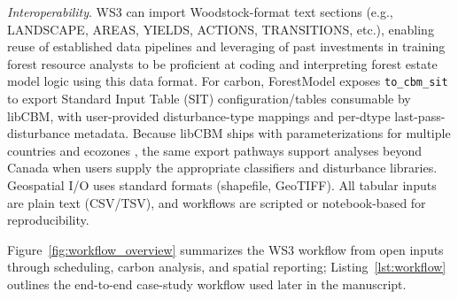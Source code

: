 \documentclass[review]{elsarticle}
\begin{document}
\emph{Interoperability}. WS3 can import Woodstock-format text sections (e.g., LANDSCAPE, AREAS, YIELDS, ACTIONS, TRANSITIONS, etc.), enabling reuse of established data pipelines and leveraging of past investments in training forest resource analysts to be proficient at coding and interpreting forest estate model logic using this data format. For carbon, ForestModel exposes \texttt{to\_cbm\_sit} to export Standard Input Table (SIT) configuration/tables consumable by libCBM, with user-provided disturbance-type mappings and per-dtype last-pass-disturbance metadata. Because libCBM ships with parameterizations for multiple countries and ecozones \citep{kurz2009cbm}, the same export pathways support analyses beyond Canada when users supply the appropriate classifiers and disturbance libraries. Geospatial I/O uses standard formats (shapefile, GeoTIFF). All tabular inputs are plain text (CSV/TSV), and workflows are scripted or notebook-based for reproducibility.

Figure~\ref{fig:workflow_overview} summarizes the WS3 workflow from open inputs through scheduling, carbon analysis, and spatial reporting; Listing~\ref{lst:workflow} outlines the end-to-end case-study workflow used later in the manuscript.
\end{document}
